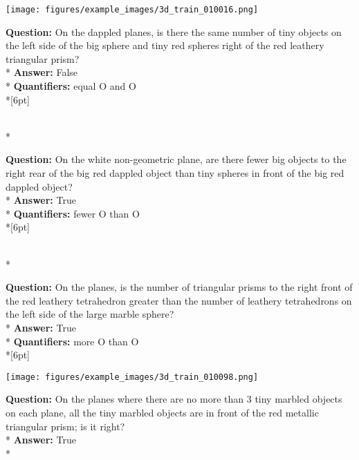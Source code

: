 \begin{figure*}
  \begin{minipage}{0.48\textwidth}
    \texttt{[image: figures/example\_images/3d\_train\_010016.png]}
    \begin{minipage}[t][2.2cm][t]{1\textwidth}
      \footnotesize
      \textbf{Question:} On the dappled planes, is there the same number of tiny objects on the left side of the big sphere and tiny red spheres right of the red leathery triangular prism? \\*
      \textbf{Answer:}  False \\*
      \textbf{Quantifiers:} equal O and O \\*[6pt]
    \end{minipage}\\*
    \begin{minipage}[t][2.2cm][t]{1\textwidth}
      \footnotesize
      \textbf{Question:} On the white non-geometric plane, are there fewer big objects to the right rear of the big red dappled object than tiny spheres in front of the big red dappled object? \\*
      \textbf{Answer:} True \\*
      \textbf{Quantifiers:} fewer O than O \\*[6pt]
    \end{minipage}\\*
    \begin{minipage}[t][2.2cm][t]{1\textwidth}
      \footnotesize
      \textbf{Question:} On the planes, is the number of triangular prisms to the right front of the red leathery tetrahedron greater than the number of leathery tetrahedrons on the left side of the large marble sphere? \\*
      \textbf{Answer:} True \\*
      \textbf{Quantifiers:} more O than O  \\*[6pt]
    \end{minipage}
  \end{minipage}
  \hspace{3.5mm}
  \begin{minipage}{0.48\textwidth}
    \texttt{[image: figures/example\_images/3d\_train\_010098.png]}
    \begin{minipage}[t][2.2cm][t]{1\textwidth}
      \footnotesize
      \textbf{Question:} On the planes where there are no more than 3 tiny marbled objects on each plane, all the tiny marbled objects are in front of the red metallic triangular prism; is it right? \\*
      \textbf{Answer:} True \\*

\end{minipage}
\end{minipage}
\end{figure*}
